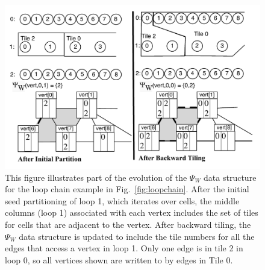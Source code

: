 \begin{figure}[t]
\centering
\includegraphics[width=\columnwidth]{sparsetiling/figures/psi_timestep.pdf}
\caption{This figure illustrates part of the evolution of the $\Psi_W$ data structure for the 
loop chain example in Fig.~\ref{fig:loopchain}.  After the initial seed partitioning
of loop 1, which iterates over cells, the middle columns (loop 1) associated with each vertex
includes the set of tiles for cells that are adjacent to the vertex.  After backward tiling,
the $\Psi_W$ data structure is updated to include the tile numbers for all the edges
that access a vertex in loop 1.  Only one edge is in tile 2 in loop 0, so all vertices shown
are written to by edges in Tile 0. }
\label{fig:tiling_psi_time}	
\end{figure}


